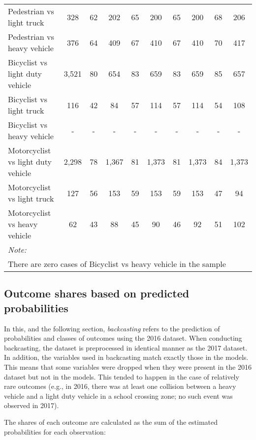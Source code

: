 \documentclass[]{elsarticle} %
\begin{document}
\begin{landscape}
\begin{table}
{\begin{tabular}[t]{lccccccccc}
\addlinespace
\rowcolor{gray!6}  Pedestrian vs light truck & 328 & 62 & 202 & 65 & 200 & 65 & 200 & 68 & 206\\
Pedestrian vs heavy vehicle & 376 & 64 & 409 & 67 & 410 & 67 & 410 & 70 & 417\\
\rowcolor{gray!6}  Bicyclist vs light duty vehicle & 3,521 & 80 & 654 & 83 & 659 & 83 & 659 & 85 & 657\\
Bicyclist vs light truck & 116 & 42 & 84 & 57 & 114 & 57 & 114 & 54 & 108\\
\rowcolor{gray!6}  Bicyclist vs heavy vehicle & - & - & - & - & - & - & - & - & -\\
\addlinespace
Motorcyclist vs light duty vehicle & 2,298 & 78 & 1,367 & 81 & 1,373 & 81 & 1,373 & 84 & 1,373\\
\rowcolor{gray!6}  Motorcyclist vs light truck & 127 & 56 & 153 & 59 & 153 & 59 & 153 & 47 & 94\\
Motorcyclist vs heavy vehicle & 62 & 43 & 88 & 45 & 90 & 46 & 92 & 51 & 102\\
\bottomrule
\multicolumn{10}{l}{\textit{Note: }}\\
\multicolumn{10}{l}{There are zero cases of Bicyclist vs heavy vehicle in the sample}\\
\end{tabular}}
\end{table}
\end{landscape}

\hypertarget{outcome-shares-based-on-predicted-probabilities}{%
\subsection{Outcome shares based on predicted
probabilities}\label{outcome-shares-based-on-predicted-probabilities}}

In this, and the following section, \emph{backcasting} refers to the
prediction of probabilities and classes of outcomes using the 2016
dataset. When conducting backcasting, the dataset is preprocessed in
identical manner as the 2017 dataset. In addition, the variables used in
backcasting match exactly those in the models. This means that some
variables were dropped when they were present in the 2016 dataset but
not in the models. This tended to happen in the case of relatively rare
outcomes (e.g., in 2016, there was at least one collision between a
heavy vehicle and a light duty vehicle in a school crossing zone; no
such event was observed in 2017).

The shares of each outcome are calculated as the sum of the estimated
probabilities for each observation:
\end{document}
